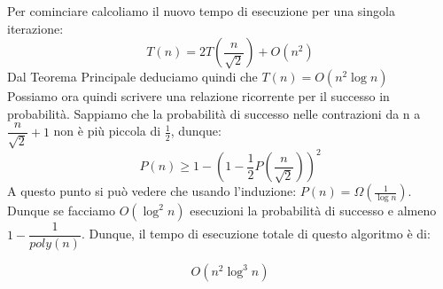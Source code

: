 Per cominciare calcoliamo il nuovo tempo di esecuzione per una singola iterazione: 
$$T(n) = 2T(\dfrac{n}{\sqrt{2}}) + O(n^2) $$
Dal Teorema Principale deduciamo quindi che $T(n) = O(n^2 \log{n})$\\

\noindent Possiamo ora quindi scrivere una relazione ricorrente per il successo in probabilità. Sappiamo che la probabilità di successo nelle contrazioni da n a $\dfrac{n}{\sqrt{2}} + 1$ non è più piccola di $\frac{1}{2}$, dunque:
$$P(n) \geq 1-(1- \frac{1}{2}P(\dfrac{n}{\sqrt{2}}))^2$$
A questo punto si può vedere che usando l'induzione: $P(n)= \Omega(\frac{1}{\log{n}}) $. Dunque se facciamo $O(\log^2{n})$ esecuzioni la probabilità di successo e almeno $1-\dfrac{1}{poly(n)}$. Dunque, il tempo di esecuzione totale di questo algoritmo è di:

$$O(n^2 \log^3{n})$$